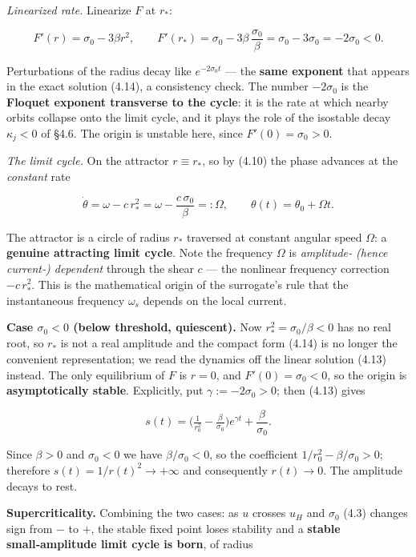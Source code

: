 \documentclass[
  11pt,
]{article}
\providecommand{\lt}{<}
\providecommand{\gt}{>}
\begin{document}
\emph{Linearized rate.} Linearize \(F\) at \(r_*\):

\[
F'(r)=\sigma_0-3\beta r^{2},\qquad
F'(r_*)=\sigma_0-3\beta\,\frac{\sigma_0}{\beta}=\sigma_0-3\sigma_0=-2\sigma_0\lt 0 .
\tag{4.15}
\]

Perturbations of the radius decay like \(e^{-2\sigma_0 t}\) --- the
\textbf{same exponent} that appears in the exact solution (4.14), a
consistency check. The number \(-2\sigma_0\) is the \textbf{Floquet
exponent transverse to the cycle}: it is the rate at which nearby orbits
collapse onto the limit cycle, and it plays the role of the isostable
decay \(\kappa_j\lt 0\) of §4.6. The origin is unstable here, since
\(F'(0)=\sigma_0\gt 0\).

\emph{The limit cycle.} On the attractor \(r\equiv r_*\), so by (4.10)
the phase advances at the \emph{constant} rate

\[
\dot\theta=\omega-c\,r_*^2=\omega-\frac{c\,\sigma_0}{\beta}=:\Omega,
\qquad \theta(t)=\theta_0+\Omega t .
\tag{4.16}
\]

The attractor is a circle of radius \(r_*\) traversed at constant
angular speed \(\Omega\): a \textbf{genuine attracting limit cycle}.
Note the frequency \(\Omega\) is \emph{amplitude‑ (hence current‑)
dependent} through the shear \(c\) --- the nonlinear frequency
correction \(-c\,r_*^2\). This is the mathematical origin of the
surrogate's rule that the instantaneous frequency \(\omega_s\) depends
on the local current.

\textbf{Case \(\sigma_0\lt 0\) (below threshold, quiescent).} Now
\(r_*^2=\sigma_0/\beta\lt 0\) has no real root, so \(r_*\) is not a real
amplitude and the compact form (4.14) is no longer the convenient
representation; we read the dynamics off the linear solution (4.13)
instead. The only equilibrium of \(F\) is \(r=0\), and
\(F'(0)=\sigma_0\lt 0\), so the origin is \textbf{asymptotically
stable}. Explicitly, put \(\gamma:=-2\sigma_0\gt 0\); then (4.13) gives

\[
s(t)=\Big(\tfrac{1}{r_0^{2}}-\tfrac{\beta}{\sigma_0}\Big)e^{\gamma t}+\frac{\beta}{\sigma_0}.
\]

Since \(\beta\gt 0\) and \(\sigma_0\lt 0\) we have
\(\beta/\sigma_0\lt 0\), so the coefficient
\(1/r_0^{2}-\beta/\sigma_0\gt 0\); therefore \(s(t)=1/r(t)^2\to+\infty\)
and consequently \(r(t)\to 0\). The amplitude decays to rest.

\textbf{Supercriticality.} Combining the two cases: as \(u\) crosses
\(u_H\) and \(\sigma_0\) (4.3) changes sign from \(-\) to \(+\), the
stable fixed point loses stability and a \textbf{stable small‑amplitude
limit cycle is born}, of radius
\end{document}
